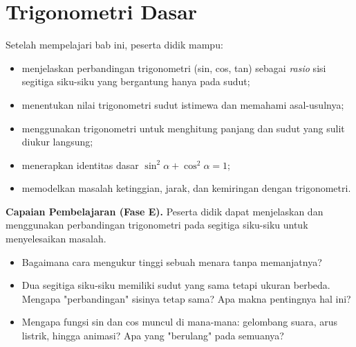 \documentclass[11pt,a4paper]{report}
\theoremstyle{gaya}
\begin{document}
\chapter{Trigonometri Dasar}
\begin{tujuan}
Setelah mempelajari bab ini, peserta didik mampu:
\begin{itemize}[leftmargin=*,topsep=2pt]
  \item menjelaskan perbandingan trigonometri (sin, cos, tan) sebagai \emph{rasio} sisi segitiga siku-siku yang bergantung hanya pada sudut;
  \item menentukan nilai trigonometri sudut istimewa dan memahami asal-usulnya;
  \item menggunakan trigonometri untuk menghitung panjang dan sudut yang sulit diukur langsung;
  \item menerapkan identitas dasar $\sin^2\alpha+\cos^2\alpha=1$;
  \item memodelkan masalah ketinggian, jarak, dan kemiringan dengan trigonometri.
\end{itemize}
\textbf{Capaian Pembelajaran (Fase E).} Peserta didik dapat menjelaskan dan menggunakan perbandingan trigonometri pada segitiga siku-siku untuk menyelesaikan masalah.
\end{tujuan}

\begin{pemantik}
\begin{itemize}[leftmargin=*,topsep=2pt]
  \item Bagaimana cara mengukur tinggi sebuah menara tanpa memanjatnya?
  \item Dua segitiga siku-siku memiliki sudut yang sama tetapi ukuran berbeda. Mengapa "perbandingan" sisinya tetap sama? Apa makna pentingnya hal ini?
  \item Mengapa fungsi sin dan cos muncul di mana-mana: gelombang suara, arus listrik, hingga animasi? Apa yang "berulang" pada semuanya?
\end{itemize}
\end{pemantik}
\end{document}
